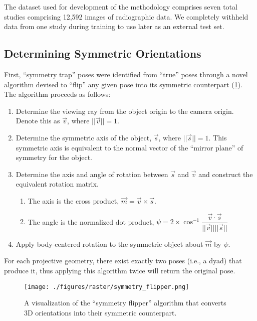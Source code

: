 {The dataset used for development of the methodology comprises seven total studies \cite{jennyRegistrationKneeKinematics2015,kefalaAssessmentKneeKinematics2017,okamotoVivoKneeKinematics2011,palm-vlasakMinimalVariationTop2022,scottCanTotalKnee2016,watanabeKneeKinematicsAnterior2013,watanabeInvivoKinematicsHighflex2016} comprising 12,592 images of radiographic data.
We completely withheld data from one study \cite{okamotoVivoKneeKinematics2011} during training to use later as an external test set.

\subsection{Determining Symmetric Orientations}
First, ``symmetry trap'' poses were identified from ``true'' poses through a novel algorithm devised to “flip” any given pose into its symmetric counterpart (\cref{fig:sym-flipper-alg}). The algorithm proceeds as follows:

\begin{enumerate}
	\item Determine the viewing ray from the object origin to the camera origin. Denote this as $\vec{v}$, where $||\vec{v}|| = 1$.
	\item Determine the symmetric axis of the object, $\vec{s}$, where $||\vec{s}|| = 1$. This symmetric axis is equivalent to the normal vector of the ``mirror plane'' of symmetry for the object.
	\item Determine the axis and angle of rotation between $\vec{s}$ and $\vec{v}$ and construct the equivalent rotation matrix.
	      \begin{enumerate}
		      \item The axis is the cross product, $\vec{m} = \vec{v} \times \vec{s}$.
		      \item The angle is the normalized dot product, $\psi = 2 \times \cos^{-1}\dfrac{\vec{v} \cdot \vec{s}}{||\vec{v}||||\vec{s}||}$
	      \end{enumerate}
	\item Apply body-centered rotation to the symmetric object about $\vec{m}$ by $\psi$.
\end{enumerate}

For each projective geometry, there exist exactly two poses (i.e., a dyad) that produce it, thus applying this algorithm twice will return the original pose.

\begin{figure}[h!]
	\centering
	\texttt{[image: ./figures/raster/symmetry\_flipper.png]}
	\caption{A visualization of the ``symmetry flipper'' algorithm that converts 3D orientations into their symmetric counterpart.}
	\label{fig:sym-flipper-alg}
\end{figure}

}
